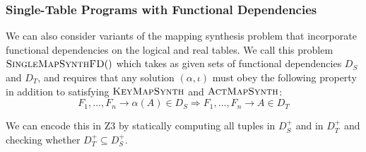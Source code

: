 \subsubsection{Single-Table Programs with Functional Dependencies}

We can also consider variants of the mapping synthesis problem that
incorporate functional dependencies on the logical and real tables. We
call this problem $\textsc{SingleMapSynthFD}()$ which takes as given
sets of functional dependencies $D_S$ and $D_T$, and requires that any
solution $(\alpha, \iota)$ must obey the following property in
addition to satisfying $\textsc{KeyMapSynth}$ and
$\textsc{ActMapSynth}$:
\[F_1,\ldots, F_n \longrightarrow \alpha(A) \in D_S \Rightarrow
  F_1,\ldots, F_n \longrightarrow A \in D_T\]

We can encode this in Z3 by statically computing all tuples in $D_S^+$
and in $D_T^+$ and checking whether $D_T^+ \subseteq D_S^+$.




